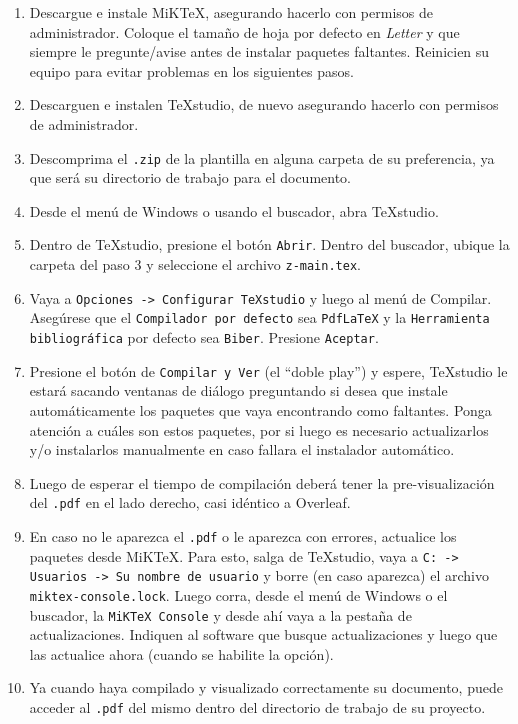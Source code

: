 \begin{enumerate}
    \itemsep 0em

    \item Descargue e instale MiKTeX, asegurando hacerlo con permisos de administrador. Coloque el tamaño de hoja por defecto en \textit{Letter} y que siempre le pregunte/avise antes de instalar paquetes faltantes. Reinicien su equipo para evitar problemas en los siguientes pasos.

    \item Descarguen e instalen TeXstudio, de nuevo asegurando hacerlo con permisos de administrador.

    \item Descomprima el \texttt{.zip} de la plantilla en alguna carpeta de su preferencia, ya que será su directorio de trabajo para el documento. 

    \item Desde el menú de Windows o usando el buscador, abra TeXstudio. 

    \item Dentro de TeXstudio, presione el botón \texttt{Abrir}. Dentro del buscador, ubique la carpeta del paso 3 y seleccione el archivo \texttt{z-main.tex}. 

    \item Vaya a \texttt{Opciones -> Configurar TeXstudio} y luego al menú de Compilar. Asegúrese que el \texttt{Compilador por defecto} sea \texttt{PdfLaTeX} y la \texttt{Herramienta bibliográfica} por defecto sea \texttt{Biber}. Presione \texttt{Aceptar}. 

    \item  Presione el botón de \texttt{Compilar y Ver} (el ``doble play'') y espere, TeXstudio le estará sacando ventanas de diálogo preguntando si desea que instale automáticamente los paquetes que vaya encontrando como faltantes. Ponga atención a cuáles son estos paquetes, por si luego es necesario actualizarlos y/o instalarlos manualmente en caso fallara el instalador automático. 

    \item Luego de esperar el tiempo de compilación deberá tener la pre-visualización del \texttt{.pdf} en el lado derecho, casi idéntico a Overleaf.

    \item En caso no le aparezca el \texttt{.pdf} o le aparezca con errores, actualice los paquetes desde MiKTeX. Para esto, salga de TeXstudio, vaya a \texttt{C: -> Usuarios -> Su nombre de usuario} y borre (en caso aparezca) el archivo \texttt{miktex-console.lock}. Luego corra, desde el menú de Windows o el buscador, la \texttt{MiKTeX Console} y desde ahí vaya a la pestaña de actualizaciones. Indiquen al software que busque actualizaciones y luego que las actualice ahora (cuando se habilite la opción).

    \item Ya cuando haya compilado y visualizado correctamente su documento, puede acceder al \texttt{.pdf} del mismo dentro del directorio de trabajo de su proyecto.
    
\end{enumerate}


